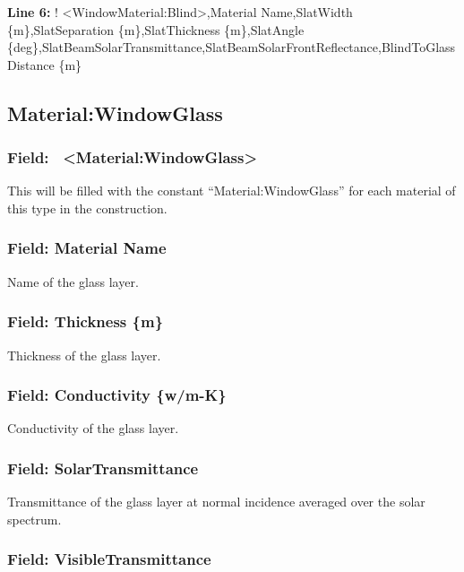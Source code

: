 \textbf{Line 6:} ! \textless{}WindowMaterial:Blind\textgreater{},Material Name,SlatWidth \{m\},SlatSeparation \{m\},SlatThickness \{m\},SlatAngle \{deg\},SlatBeamSolarTransmittance,SlatBeamSolarFrontReflectance,BlindToGlassDistance \{m\}

\subsection{\texorpdfstring{Material\textbf{:}WindowGlass}{Material:WindowGlass}}\label{materialwindowglass}

\subsubsection{Field:~ \textless{}Material:WindowGlass\textgreater{}}\label{field-materialwindowglass}

This will be filled with the constant ``Material:WindowGlass'' for each material of this type in the construction.

\subsubsection{Field: Material Name}\label{field-material-name-2}

Name of the glass layer.

\subsubsection{Field: Thickness \{m\}}\label{field-thickness-m}

Thickness of the glass layer.

\subsubsection{Field: Conductivity \{w/m-K\}}\label{field-conductivity-wm-k}

Conductivity of the glass layer.

\subsubsection{Field: SolarTransmittance}\label{field-solartransmittance}

Transmittance of the glass layer at normal incidence averaged over the solar spectrum.

\subsubsection{Field: VisibleTransmittance}\label{field-visibletransmittance}

